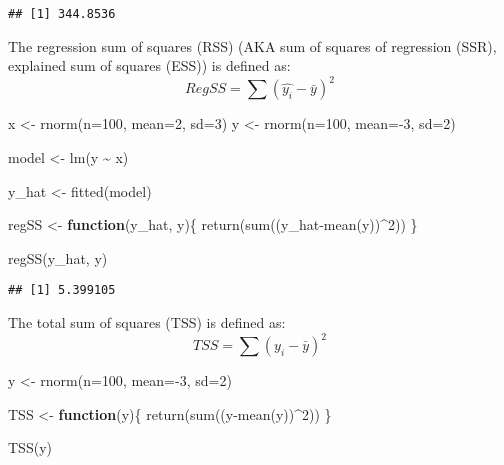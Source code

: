 \documentclass[
]{article}
\newenvironment{Shaded}{\begin{snugshade}}{\end{snugshade}}
\newcommand{\AttributeTok}[1]{\textcolor[rgb]{0.77,0.63,0.00}{#1}}
\newcommand{\ControlFlowTok}[1]{\textcolor[rgb]{0.13,0.29,0.53}{\textbf{#1}}}
\newcommand{\DecValTok}[1]{\textcolor[rgb]{0.00,0.00,0.81}{#1}}
\newcommand{\FunctionTok}[1]{\textcolor[rgb]{0.00,0.00,0.00}{#1}}
\newcommand{\NormalTok}[1]{#1}
\newcommand{\OtherTok}[1]{\textcolor[rgb]{0.56,0.35,0.01}{#1}}
\newcommand{\SpecialCharTok}[1]{\textcolor[rgb]{0.00,0.00,0.00}{#1}}
\begin{document}
\begin{verbatim}
## [1] 344.8536
\end{verbatim}

The regression sum of squares (RSS) (AKA sum of squares of regression
(SSR), explained sum of squares (ESS)) is defined as:
\[RegSS=\sum(\hat{y_i}-\bar{y})^2\]

\begin{Shaded}
\begin{Highlighting}[]
\NormalTok{x }\OtherTok{\textless{}{-}} \FunctionTok{rnorm}\NormalTok{(}\AttributeTok{n=}\DecValTok{100}\NormalTok{, }\AttributeTok{mean=}\DecValTok{2}\NormalTok{, }\AttributeTok{sd=}\DecValTok{3}\NormalTok{)}
\NormalTok{y }\OtherTok{\textless{}{-}} \FunctionTok{rnorm}\NormalTok{(}\AttributeTok{n=}\DecValTok{100}\NormalTok{, }\AttributeTok{mean=}\SpecialCharTok{{-}}\DecValTok{3}\NormalTok{, }\AttributeTok{sd=}\DecValTok{2}\NormalTok{)}

\NormalTok{model }\OtherTok{\textless{}{-}} \FunctionTok{lm}\NormalTok{(y }\SpecialCharTok{\textasciitilde{}}\NormalTok{ x)}

\NormalTok{y\_hat }\OtherTok{\textless{}{-}} \FunctionTok{fitted}\NormalTok{(model)}

\NormalTok{regSS }\OtherTok{\textless{}{-}} \ControlFlowTok{function}\NormalTok{(y\_hat, y)\{}
  \FunctionTok{return}\NormalTok{(}\FunctionTok{sum}\NormalTok{((y\_hat}\SpecialCharTok{{-}}\FunctionTok{mean}\NormalTok{(y))}\SpecialCharTok{\^{}}\DecValTok{2}\NormalTok{))}
\NormalTok{\}}

\FunctionTok{regSS}\NormalTok{(y\_hat, y)}
\end{Highlighting}
\end{Shaded}

\begin{verbatim}
## [1] 5.399105
\end{verbatim}

The total sum of squares (TSS) is defined as:
\[TSS=\sum(y_i-\bar{y})^2\]

\begin{Shaded}
\begin{Highlighting}[]
\NormalTok{y }\OtherTok{\textless{}{-}} \FunctionTok{rnorm}\NormalTok{(}\AttributeTok{n=}\DecValTok{100}\NormalTok{, }\AttributeTok{mean=}\SpecialCharTok{{-}}\DecValTok{3}\NormalTok{, }\AttributeTok{sd=}\DecValTok{2}\NormalTok{)}

\NormalTok{TSS }\OtherTok{\textless{}{-}} \ControlFlowTok{function}\NormalTok{(y)\{}
  \FunctionTok{return}\NormalTok{(}\FunctionTok{sum}\NormalTok{((y}\SpecialCharTok{{-}}\FunctionTok{mean}\NormalTok{(y))}\SpecialCharTok{\^{}}\DecValTok{2}\NormalTok{))}
\NormalTok{\}}

\FunctionTok{TSS}\NormalTok{(y)}
\end{Highlighting}
\end{Shaded}
\end{document}
